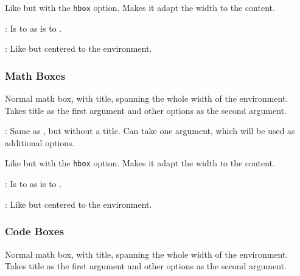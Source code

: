\documentclass[
../../Summary.tex,
]
{subfiles}
\begin{document}
\begin{smalldefbox}
    [smalldefbox]
    Like  but with the \texttt{hbox} option. Makes it adapt the width to the content.
\end{smalldefbox}

\begin{smalldefbox*}
    : Is to  as  is to .
\end{smalldefbox*}

\begin{csdb*}
    : Like  but centered to the environment.
\end{csdb*}


\subsubsection{Math Boxes}
\begin{mathbox}
    [mathbox]
    Normal math box, with title, spanning the whole width of the environment. Takes title as the first argument and other options as the second argument.
\end{mathbox}

\begin{mathbox*}
    : Same as , but without a title. Can take one argument, which will be used as additional options.
\end{mathbox*}

\begin{smallmathbox}
    [smallmathbox]
    Like  but with the \texttt{hbox} option. Makes it adapt the width to the content.
\end{smallmathbox}

\begin{smallmathbox*}
    : Is to  as  is to .
\end{smallmathbox*}

\begin{csmb*}
    : Like  but centered to the environment.
\end{csmb*}


\subsubsection{Code Boxes}
\begin{codebox}
    [codebox]
    Normal math box, with title, spanning the whole width of the environment. Takes title as the first argument and other options as the second argument.
\end{codebox}
\end{document}
